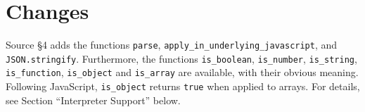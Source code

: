 





\section*{Changes}

Source \S 4 adds the functions \lstinline{parse},
\lstinline{apply_in_underlying_javascript}, and
\lstinline{JSON.stringify}.
Furthermore, the functions \lstinline{is_boolean}, \lstinline{is_number},
\lstinline{is_string}, \lstinline{is_function}, \lstinline{is_object} and
\lstinline{is_array} are available, with their obvious meaning.
Following JavaScript, \lstinline{is_object} returns \lstinline{true} when
applied to arrays. For details, see 
Section ``Interpreter Support'' below.




